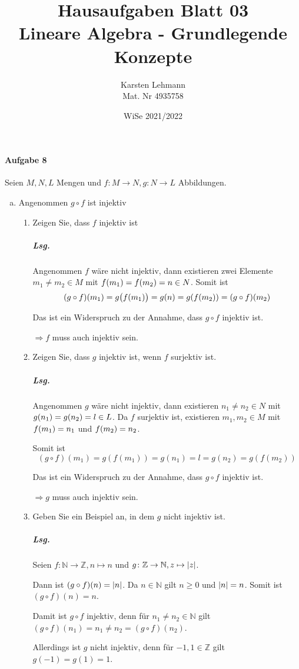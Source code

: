 \documentclass{scrreprt}
\author{Karsten Lehmann\\Mat. Nr 4935758}
\date{WiSe 2021/2022}
\title{Hausaufgaben Blatt 03\\Lineare Algebra - Grundlegende Konzepte}
\begin{document}
\paragraph{Aufgabe 8} Seien $M, N, L$ Mengen und
$f \colon M \to N, g \colon N \to L$ Abbildungen.
\begin{enumerate}[(a)]
\item Angenommen $g \circ f$ ist injektiv
  \begin{enumerate}[label={(a\arabic*)}]
  \item Zeigen Sie, dass $f$ injektiv ist

    \subparagraph{Lsg.} Angenommen $f$ wäre nicht injektiv,
    dann existieren zwei Elemente $m_1 \ne m_2 \in M$ mit
    $f\qty(m_1) = f\qty(m_2) = n \in N$.
    Somit ist
    \[
      (g \circ f)\qty(m_1) = g\qty\big(f(m_1)) = g(n) = g\qty(f(m_2))
      = (g \circ f)(m_2)
    \]

    Das ist ein Widerspruch zu der Annahme, dass $g \circ f$ injektiv ist.

    $\Rightarrow f$ muss auch injektiv sein.
  \item Zeigen Sie, dass $g$ injektiv ist, wenn $f$ surjektiv ist.

    \subparagraph{Lsg.} Angenommen $g$ wäre nicht injektiv,
    dann existieren $n_1 \ne n_2 \in N$ mit $g\qty(n_1) = g\qty(n_2) = l \in L$.
    Da $f$ surjektiv ist, existieren $m_1, m_2 \in M$ mit $f\qty(m_1) = n_1$
    und $f\qty(m_2) = n_2$.

    Somit ist
    \[
      (g \circ f)(m_1) = g(f(m_1)) = g(n_1) = l = g(n_2) = g(f(m_2))
    \]

    Das ist ein Widerspruch zu der Annahme, dass $g \circ f$ injektiv ist.

    $\Rightarrow g$ muss auch injektiv sein.

  \item Geben Sie ein Beispiel an, in dem $g$ nicht injektiv ist.

    \subparagraph{Lsg.} Seien $f \colon \mathbb{N} \to \mathbb{Z}, n \mapsto n$
    und $g \colon \mathbb{Z} \to \mathbb{N}, z \mapsto \abs{z}$.

    Dann ist $(g \circ f)(n) = \abs{n}$.
    Da $n \in \mathbb{N}$ gilt $n \geq 0$ und $\abs{n} = n$.
    Somit ist $(g \circ f)(n) = n$.

    Damit ist $g \circ f$ injektiv, denn für $n_1 \ne n_2 \in \mathbb{N}$ gilt
    $(g \circ f)(n_1) = n_1 \ne n_2 = (g \circ f)(n_2)$.

    Allerdings ist $g$ nicht injektiv, denn für $-1, 1 \in \mathbb{Z}$ gilt
    $g(-1) = g(1) = 1$.
  \end{enumerate}


\end{enumerate}
\end{document}
